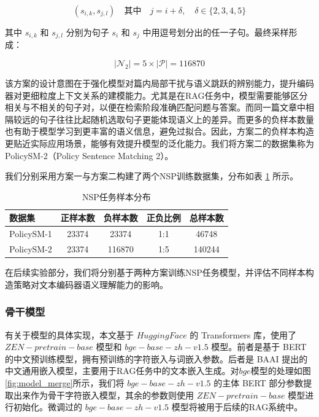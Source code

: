 \documentclass[12pt, a4paper]{ctexart}
\begin{document}
\begin{equation}
(s_{i,k}, s_{j,l}) \quad \text{其中} \quad j = i + \delta,\quad \delta \in \{2, 3, 4, 5\}
\end{equation}

其中 $s_{i,k}$ 和 $s_{j,l}$ 分别为句子 $s_i$ 和 $s_j$ 中用逗号划分出的任一子句。最终采样形成：

\begin{equation}
|\mathcal{N}_2| = 5 \times |\mathcal{P}| = 116870
\end{equation}

该方案的设计意图在于强化模型对篇内局部干扰与语义跳跃的辨别能力，提升编码器对更细粒度上下文关系的建模能力。尤其是在RAG任务中，模型需要能够区分相关与不相关的句子对，以便在检索阶段准确匹配问题与答案。而同一篇文章中相隔较远的句子往往比起随机选取句子更能体现语义上的差异。而更多的负样本数量也有助于模型学习到更丰富的语义信息，避免过拟合。因此，方案二的负样本构造更贴近实际应用场景，能够有效提升模型的泛化能力。我们将方案二的数据集称为PolicySM-2（Policy Sentence Matching 2）。

我们分别采用方案一与方案二构建了两个NSP训练数据集，分布如表 \ref{tab:nsp_samples} 所示。

\begin{table}[H]
    \centering
    \caption{NSP任务样本分布}
    \begin{tabular}{lcccc}
        \toprule
        数据集 & 正样本数 & 负样本数 & 正负比例 & 总样本数 \\
        \midrule
        PolicySM-1 & 23374 & 23374 & 1:1 & 46748 \\
        PolicySM-2 & 23374 & 116870 & 1:5 & 140244 \\
        \bottomrule
    \end{tabular}
    \label{tab:nsp_samples}
\end{table}

在后续实验部分，我们将分别基于两种方案训练NSP任务模型，并评估不同样本构造策略对文本编码器语义理解能力的影响。

\subsubsection{骨干模型}
有关于模型的具体实现，本文基于 $Hugging Face$ 的 Transformers 库，使用了 $ZEN-pretrain-base$ 模型和 $bge-base-zh-v1.5$ 模型。前者是基于 BERT 的中文预训练模型，拥有预训练的字符嵌入与词嵌入参数。后者是 BAAI 提出的中文通用嵌入模型，主要用于RAG任务中的文本嵌入生成。对$bge$模型的处理如图\ref{fig:model_merge}所示，我们将 $bge-base-zh-v1.5$ 的主体 BERT 部分参数提取出来作为骨干字符嵌入模型，其余的参数则使用 $ZEN-pretrain-base$ 模型进行初始化。微调过的 $bge-base-zh-v1.5$ 模型将被用于后续的RAG系统中。
\end{document}
